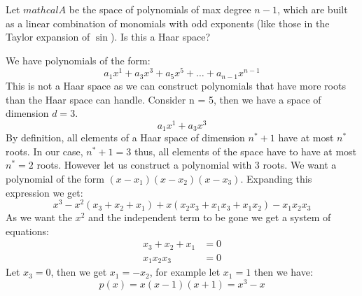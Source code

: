 \begin{problem}
Let $mathcal{A}$ be the space of polynomials of max degree $n-1$, which are built as a linear combination of monomials with odd exponents (like those in the Taylor expansion of $\sin$). Is this a Haar space?
\end{problem}

\begin{solution}
We have polynomials of the form:
\begin{equation*}
a_1x^1+a_3x^3+a_5x^5+\ldots+a_{n-1}x^{n-1}
\end{equation*}
This is not a Haar space as we can construct polynomials that have more roots than the Haar space can handle. Consider n = 5, then we have a space of dimension $d=3$.
\begin{equation*}
a_1x^1+a_3x^3
\end{equation*}
By definition, all elements of a Haar space of dimension $n^*+1$ have at most $n^*$ roots. In our case, $n^*+1 = 3$ thus, all elements of the space have to have at most $n^*=2$ roots. However let us construct a polynomial with 3 roots. We want a polynomial of the form $(x-x_1)(x-x_2)(x-x_3)$. Expanding this expression we get:
\begin{equation*}
x^3-x^2(x_3+x_2+x_1)+x(x_2x_3+x_1x_3+x_1x_2)-x_1x_2x_3
\end{equation*}
As we want the $x^2$ and the independent term to be gone we get a system of equations:
\begin{align*}
x_3+x_2+x_1 &= 0 \\
x_1x_2x_3 &= 0
\end{align*}
Let $x_3 = 0$, then we get $x_1 = -x_2$, for example let $x_1 = 1$ then we have:
\begin{equation*}
p(x) = x(x-1)(x+1) = x^3-x
\end{equation*}
\end{solution}